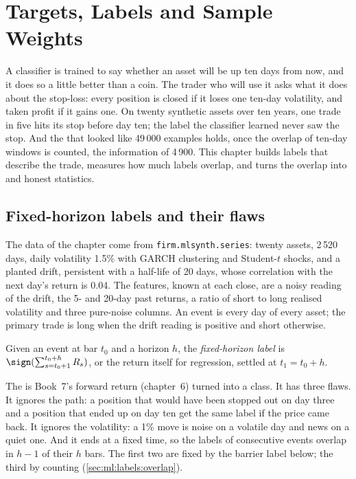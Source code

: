 \chapter{Targets, Labels and Sample Weights}\label{ch:ml:targets-labels-and-sample-weights}

A classifier is trained to say whether an asset will be up ten days from now, and it does so a little better than a
coin. The trader who will use it asks what it does about the stop-loss: every position is closed if it loses one
ten-day volatility, and taken profit if it gains one. On twenty synthetic assets over ten years, one trade in five hits
its stop before day ten; the label the classifier learned never saw the stop. And the  that looked like
49\,000 examples holds, once the overlap of ten-day windows is counted, the information of 4\,900. This chapter builds
labels that describe the trade, measures how much labels overlap, and turns the overlap into  and
honest statistics.

\section{Fixed-horizon labels and their flaws}

The data of the chapter come from \texttt{firm.mlsynth.series}: twenty assets, 2\,520 days, daily volatility 1.5\% with
GARCH clustering and Student-$t$ shocks, and a planted drift, persistent with a half-life of 20 days, whose correlation
with the next day's return is 0.04. The features, known at each close, are a noisy reading of the drift, the 5- and
20-day past returns, a ratio of short to long realised volatility and three pure-noise columns. An event is every day
of every asset; the primary trade is long when the drift reading is positive and short otherwise.

\begin{definition}\label{def:ml:targets-labels-and-sample-weights:fixed}
Given an event at bar $t_0$ and a horizon $h$, the \emph{fixed-horizon label} is
$\sign(\sum_{s=t_0+1}^{t_0+h}R_s)$, or the return itself for regression, settled at $t_1 = t_0 + h$.
\end{definition}

The  is Book~7's forward return (chapter~6) turned into a class. It has three flaws. It ignores the
path: a position that would have been stopped out on day three and a position that ended up on day ten get the same
label if the price came back. It ignores the volatility: a 1\% move is noise on a volatile day and news on a quiet one.
And it ends at a fixed time, so the labels of consecutive events overlap in $h - 1$ of their $h$ bars. The first two
are fixed by the barrier label below; the third by counting (\cref{sec:ml:labels:overlap}).

